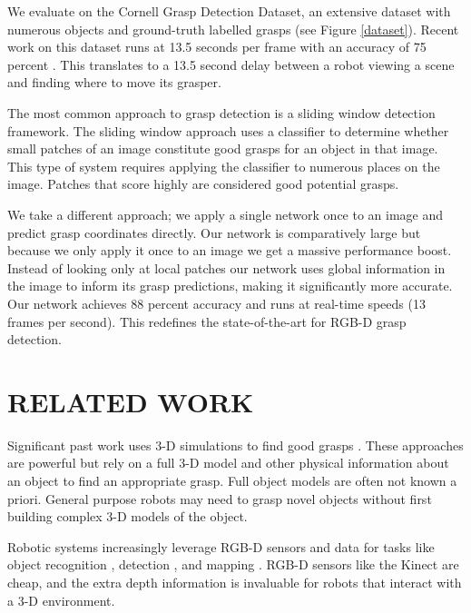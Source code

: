 \documentclass[letterpaper, 10 pt, conference]{ieeeconf}
\begin{document}
We evaluate on the Cornell Grasp Detection Dataset, an extensive dataset with numerous objects and ground-truth labelled grasps (see Figure \ref{dataset}). Recent work on this dataset runs at 13.5 seconds per frame with an accuracy of 75 percent \cite{lenz2013deep} \cite{jiang2011efficient}. This translates to a 13.5 second delay between a robot viewing a scene and finding where to move its grasper.

The most common approach to grasp detection is a sliding window detection framework. The sliding window approach uses a classifier to determine whether small patches of an image constitute good grasps for an object in that image. This type of system requires applying the classifier to numerous places on the image. Patches that score highly are considered good potential grasps.

We take a different approach; we apply a single network once to an image and predict grasp coordinates directly. Our network is comparatively large but because we only apply it once to an image we get a massive performance boost. Instead of looking only at local patches our network uses global information in the image to inform its grasp predictions, making it significantly more accurate. Our network achieves 88 percent accuracy and runs at real-time speeds (13 frames per second). This redefines the state-of-the-art for RGB-D grasp detection.

\section{RELATED WORK}

Significant past work uses 3-D simulations to find good grasps \cite{bicchi2000robotic} \cite{miller2003automatic} \cite{miller2004graspit} \cite{pelossof2004svm} \cite{leon2010opengrasp}. These approaches are powerful but rely on a full 3-D model and other physical information about an object to find an appropriate grasp. Full object models are often not known a priori. General purpose robots may need to grasp novel objects without first building complex 3-D models of the object.

Robotic systems increasingly leverage RGB-D sensors and data for tasks like object recognition \cite{lai2011large}, detection \cite{lai2012detection} \cite{blum2012learned}, and mapping \cite{henry2010rgb} \cite{endres2012evaluation}. RGB-D sensors like the Kinect are cheap, and the extra depth information is invaluable for robots that interact with a 3-D environment.
\end{document}
